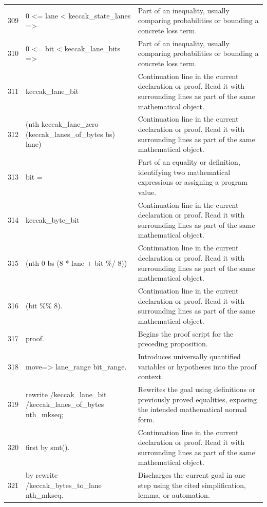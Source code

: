 \documentclass[10pt]{article}
\begin{document}
\begin{longtable}{r L{0.53\textwidth} L{0.37\textwidth}}
309 & {\ttfamily\scriptsize   0 <= lane < keccak\_state\_lanes =>} & Part of an inequality, usually comparing probabilities or bounding a concrete loss term. \\
310 & {\ttfamily\scriptsize   0 <= bit < keccak\_lane\_bits =>} & Part of an inequality, usually comparing probabilities or bounding a concrete loss term. \\
311 & {\ttfamily\scriptsize   keccak\_lane\_bit} & Continuation line in the current declaration or proof.  Read it with surrounding lines as part of the same mathematical object. \\
312 & {\ttfamily\scriptsize     (nth keccak\_lane\_zero (keccak\_lanes\_of\_bytes bs) lane)} & Continuation line in the current declaration or proof.  Read it with surrounding lines as part of the same mathematical object. \\
313 & {\ttfamily\scriptsize     bit =} & Part of an equality or definition, identifying two mathematical expressions or assigning a program value. \\
314 & {\ttfamily\scriptsize   keccak\_byte\_bit} & Continuation line in the current declaration or proof.  Read it with surrounding lines as part of the same mathematical object. \\
315 & {\ttfamily\scriptsize     (nth 0 bs (8 * lane + bit \%/ 8))} & Continuation line in the current declaration or proof.  Read it with surrounding lines as part of the same mathematical object. \\
316 & {\ttfamily\scriptsize     (bit \%\% 8).} & Continuation line in the current declaration or proof.  Read it with surrounding lines as part of the same mathematical object. \\
317 & {\ttfamily\scriptsize proof.} & Begins the proof script for the preceding proposition. \\
318 & {\ttfamily\scriptsize move=> lane\_range bit\_range.} & Introduces universally quantified variables or hypotheses into the proof context. \\
319 & {\ttfamily\scriptsize rewrite /keccak\_lane\_bit /keccak\_lanes\_of\_bytes nth\_mkseq;} & Rewrites the goal using definitions or previously proved equalities, exposing the intended mathematical normal form. \\
320 & {\ttfamily\scriptsize   first by smt().} & Continuation line in the current declaration or proof.  Read it with surrounding lines as part of the same mathematical object. \\
321 & {\ttfamily\scriptsize by rewrite /keccak\_bytes\_to\_lane nth\_mkseq.} & Discharges the current goal in one step using the cited simplification, lemma, or automation. \\

\end{longtable}
\end{document}
